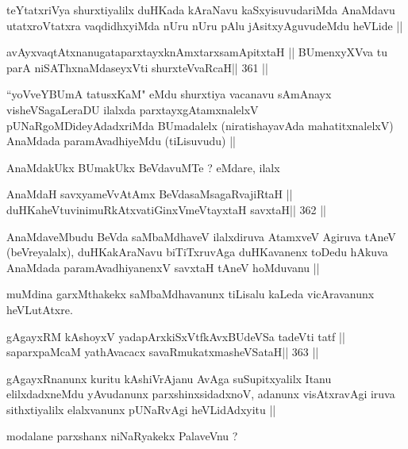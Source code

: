 \begin{artha}
teYtatxriVya shurxtiyalilx duHKada kAraNavu kaSxyisuvudariMda AnaMdavu utatxroVtatxra vaqdidhxyiMda nUru nUru pAlu jAsitxyAguvudeMdu heVLide ||
\end{artha}

\begin{shl}
avAyxvaqtAtxnanugataparxtayxknAmxtarxsamApitxtaH ||
BUmenxyXVva tu parA niSAThx\s\s naMdaseyxVti shurxteVvaRcaH\hfill || 361 ||
\end{shl}

\begin{artha}
``yoVveYBUmA tatusxKaM" eMdu shurxtiya vacanavu sAmAnayx 
visheVSagaLeraDU ilalxda parxtayxgAtamxnalelxV pUNaRgoMDideyAdadxriMda 
BUmadalelx (niratishayavAda mahatitxnalelxV) AnaMdada paramAvadhiyeMdu (tiLisuvudu) ||
\end{artha}

\begin{artha}
AnaMdakUkx BUmakUkx BeVdavuMTe ? eMdare, ilalx
\end{artha}

\begin{shl}
AnaMdaH savxyameVvA\s\s tAmx BeVdasaMsagaRvajiRtaH ||
duHKaheVtuvinimuRkAtxvatiGinxVmeVtayxtaH savxtaH\hfill || 362 ||
\end{shl}

\begin{artha}
AnaMdaveMbudu BeVda saMbaMdhaveV ilalxdiruva AtamxveV Agiruva tAneV (beVreyalalx), duHKakAraNavu biTiTxruvAga duHKavanenx toDedu hAkuva AnaMdada paramAvadhiyanenxV savxtaH tAneV hoMduvanu ||
\end{artha}

\begin{artha}
muMdina garxMthakekx saMbaMdhavanunx tiLisalu kaLeda vicAravanunx heVLutAtxre.
\end{artha}

\begin{shl}
gAgayxRM kAshoyxV yadapArxkiSxVtfkAvxBUdeVSa tadeVti tatf ||
saparxpaMcaM yathAvacacx savaRmukatxmasheVSataH\hfill || 363 ||
\end{shl}

\begin{artha}
gAgayxRnanunx kuritu kAshiVrAjanu AvAga suSupitxyalilx Itanu elilxdadxneMdu yAvudanunx parxshinxsidadxnoV, adanunx visAtxravAgi iruva sithxtiyalilx elalxvanunx pUNaRvAgi heVLidAdxyitu ||
\end{artha}

\begin{artha}
modalane parxshanx niNaRyakekx PalaveVnu ?
\end{artha}

